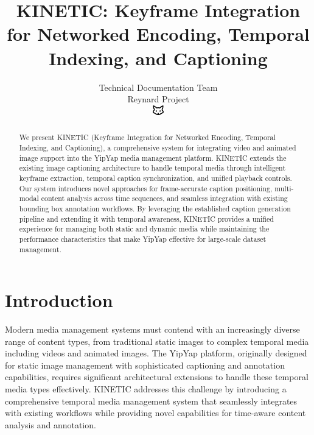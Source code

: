 \documentclass[10pt]{article}
\begin{document}
\title{KINETIC: Keyframe Integration for Networked Encoding, Temporal Indexing, and Captioning}

\author{Technical Documentation Team\\
Reynard Project\\
\includegraphics[width=0.5cm]{favicon.pdf}}

\maketitle

\begin{abstract}
We present KINETIC (Keyframe Integration for Networked Encoding, Temporal Indexing, and Captioning), a comprehensive system for integrating video and animated image support into the YipYap media management platform. KINETIC extends the existing image captioning architecture to handle temporal media through intelligent keyframe extraction, temporal caption synchronization, and unified playback controls. Our system introduces novel approaches for frame-accurate caption positioning, multi-modal content analysis across time sequences, and seamless integration with existing bounding box annotation workflows. By leveraging the established caption generation pipeline and extending it with temporal awareness, KINETIC provides a unified experience for managing both static and dynamic media while maintaining the performance characteristics that make YipYap effective for large-scale dataset management.
\end{abstract}

\section{Introduction}

Modern media management systems must contend with an increasingly diverse range of content types, from traditional static images to complex temporal media including videos and animated images. The YipYap platform, originally designed for static image management with sophisticated captioning and annotation capabilities, requires significant architectural extensions to handle these temporal media types effectively. KINETIC addresses this challenge by introducing a comprehensive temporal media management system that seamlessly integrates with existing workflows while providing novel capabilities for time-aware content analysis and annotation.
\end{document}
